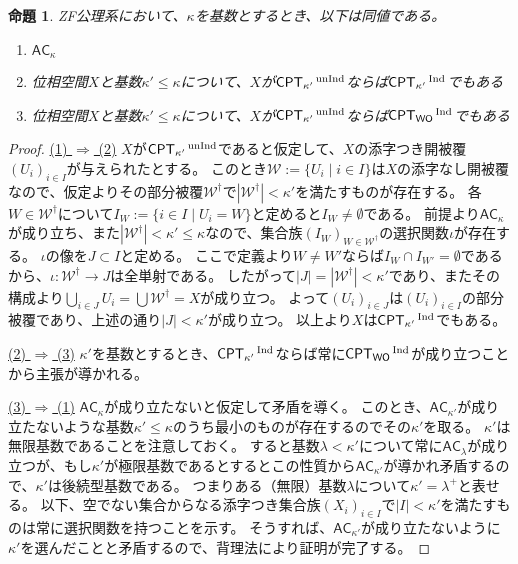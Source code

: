 \documentclass{jarticle}
\newtheorem{proposition}{命題}
\newcommand{\WithIndex}[1]{$\textrm{#1}{}^{\,\textrm{\scriptsize Ind}}$}
\newcommand{\WithoutIndex}[1]{$\textrm{#1}{}^{\,\textrm{\scriptsize unInd}}$}
\begin{document}
\begin{proposition}
\label{prop:relation_of_two_compactness}
ZF公理系において、$\kappa$を基数とするとき、以下は同値である。
\begin{enumerate}
\item
$\mathsf{AC}_{\kappa}$
\item
位相空間$X$と基数$\kappa' \leq \kappa$について、$X$が\WithoutIndex{$\mathsf{CPT}_{\kappa'}$}ならば\WithIndex{$\mathsf{CPT}_{\kappa'}$}でもある
\item
位相空間$X$と基数$\kappa' \leq \kappa$について、$X$が\WithoutIndex{$\mathsf{CPT}_{\kappa'}$}ならば\WithIndex{$\mathsf{CPT}_{\mathsf{WO}}$}でもある
\end{enumerate}
\end{proposition}
\begin{proof}
\underline{(1) $\Rightarrow$ (2)}
$X$が\WithoutIndex{$\mathsf{CPT}_{\kappa'}$}であると仮定して、$X$の添字つき開被覆$(U_i)_{i \in I}$が与えられたとする。
このとき$\mathcal{W} := \{U_i \mid i \in I\}$は$X$の添字なし開被覆なので、仮定よりその部分被覆$\mathcal{W}^{\dagger}$で$|\mathcal{W}^{\dagger}| < \kappa'$を満たすものが存在する。
各$W \in \mathcal{W}^{\dagger}$について$I_W := \{i \in I \mid U_i = W\}$と定めると$I_W \neq \emptyset$である。
前提より$\mathsf{AC}_{\kappa}$が成り立ち、また$|\mathcal{W}^{\dagger}| < \kappa' \leq \kappa$なので、集合族$(I_W)_{W \in \mathcal{W}^{\dagger}}$の選択関数$\iota$が存在する。
$\iota$の像を$J \subset I$と定める。
ここで定義より$W \neq W'$ならば$I_W \cap I_{W'} = \emptyset$であるから、$\iota \colon \mathcal{W}^{\dagger} \to J$は全単射である。
したがって$|J| = |\mathcal{W}^{\dagger}| < \kappa'$であり、またその構成より$\bigcup_{i \in J} U_i = \bigcup \mathcal{W}^{\dagger} = X$が成り立つ。
よって$(U_i)_{i \in J}$は$(U_i)_{i \in I}$の部分被覆であり、上述の通り$|J| < \kappa'$が成り立つ。
以上より$X$は\WithIndex{$\mathsf{CPT}_{\kappa'}$}でもある。

\underline{(2) $\Rightarrow$ (3)}
$\kappa'$を基数とするとき、\WithIndex{$\mathsf{CPT}_{\kappa'}$}ならば常に\WithIndex{$\mathsf{CPT}_{\mathsf{WO}}$}が成り立つことから主張が導かれる。

\underline{(3) $\Rightarrow$ (1)}
$\mathsf{AC}_{\kappa}$が成り立たないと仮定して矛盾を導く。
このとき、$\mathsf{AC}_{\kappa'}$が成り立たないような基数$\kappa' \leq \kappa$のうち最小のものが存在するのでその$\kappa'$を取る。
$\kappa'$は無限基数であることを注意しておく。
すると基数$\lambda < \kappa'$について常に$\mathsf{AC}_{\lambda}$が成り立つが、もし$\kappa'$が極限基数であるとするとこの性質から$\mathsf{AC}_{\kappa'}$が導かれ矛盾するので、$\kappa'$は後続型基数である。
つまりある（無限）基数$\lambda$について$\kappa' = \lambda^{+}$と表せる。
以下、空でない集合からなる添字つき集合族$(X_i)_{i \in I}$で$|I| < \kappa'$を満たすものは常に選択関数を持つことを示す。
そうすれば、$\mathsf{AC}_{\kappa'}$が成り立たないように$\kappa'$を選んだことと矛盾するので、背理法により証明が完了する。


\end{proof}
\end{document}
